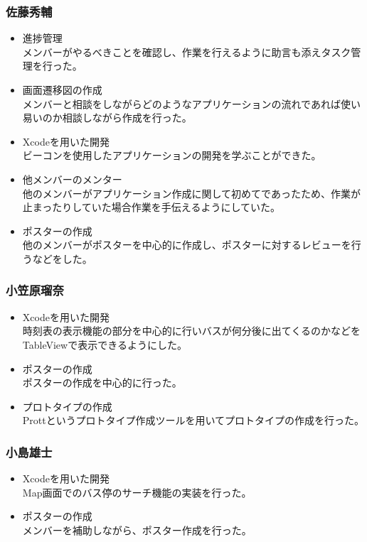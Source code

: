 \documentclass[openany,11pt,papersize]{jsbook}
\begin{document}
\subsubsection{佐藤秀輔}
\begin{itemize}
	\item 進捗管理\\
    メンバーがやるべきことを確認し、作業を行えるように助言も添えタスク管理を行った。
  \item 画面遷移図の作成\\
    メンバーと相談をしながらどのようなアプリケーションの流れであれば使い易いのか相談しながら作成を行った。
	\item Xcodeを用いた開発\\
    ビーコンを使用したアプリケーションの開発を学ぶことができた。
  \item 他メンバーのメンター\\
    他のメンバーがアプリケーション作成に関して初めてであったため、作業が止まったりしていた場合作業を手伝えるようにしていた。
  \item ポスターの作成\\
    他のメンバーがポスターを中心的に作成し、ポスターに対するレビューを行うなどをした。
\end{itemize}

\subsubsection{小笠原瑠奈}
\begin{itemize}
	\item Xcodeを用いた開発\\
    時刻表の表示機能の部分を中心的に行いバスが何分後に出てくるのかなどをTableViewで表示できるようにした。
  \item ポスターの作成\\
    ポスターの作成を中心的に行った。
  \item プロトタイプの作成\\
    Prottというプロトタイプ作成ツールを用いてプロトタイプの作成を行った。
\end{itemize}

\subsubsection{小島雄士}
\begin{itemize}
	\item Xcodeを用いた開発\\
    Map画面でのバス停のサーチ機能の実装を行った。
  \item ポスターの作成\\
    メンバーを補助しながら、ポスター作成を行った。
\end{itemize}
\end{document}

